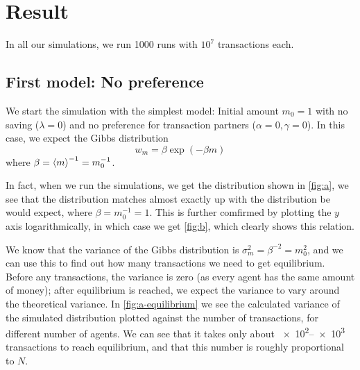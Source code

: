 \documentclass[12pt,a4paper]{article}
\begin{document}
\clearpage

\section{Result}

In all our simulations, we run 1000 runs with $10^7$ transactions each.

\subsection{First model: No preference}

We start the simulation with the simplest model: Initial amount $m_0 = 1$ with no saving ($\lambda = 0$) and no preference for transaction partners ($\alpha = 0, \gamma = 0$). In this case, we expect the Gibbs distribution
\begin{equation}
  w_m = \beta \exp(-\beta m)
\end{equation}
where $\beta = \expval{m}^{-1} = m_0^{-1}$.

In fact, when we run the simulations, we get the distribution shown in \cref{fig:a}, we see that the distribution matches almost exactly up with the distribution be would expect, where $\beta = m_0^{-1} = 1$. This is further comfirmed by plotting the $y$ axis logarithmically, in which case we get \cref{fig:b}, which clearly shows this relation.

We know that the variance of the Gibbs distribution is $\sigma_m^2 = \beta^{-2} = m_0^2$, and we can use this to find out how many transactions we need to get equilibrium. Before any transactions, the variance is zero (as every agent has the same amount of money); after equilibrium is reached, we expect the variance to vary around the theoretical variance.
In \cref{fig:a-equilibrium} we see the calculated variance of the simulated distribution plotted against the number of transactions, for different number of agents. We can see that it takes only about \numrange{e2}{e3} transactions to reach equilibrium, and that this number is roughly proportional to $N$.
\end{document}
